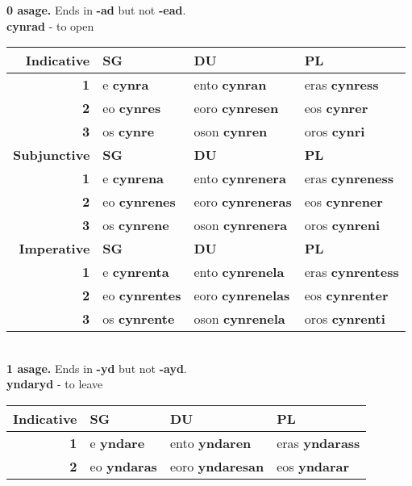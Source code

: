 \begin{center}
  \textbf{0 asage.} Ends in \textbf{-ad} but not \textbf{-ead}. \\
  \textbf{cynrad} - to open \\
  \begin{tabular}{|r|l|l|l|}
    \hline
    \textbf{Indicative} & \textbf{SG} & \textbf{DU} & \textbf{PL} \\ \hline
    \textbf{1} & e \textbf{cynra} & ento \textbf{cynran} & eras \textbf{cynress} \\ \hline
    \textbf{2} & eo \textbf{cynres} & eoro \textbf{cynresen} & eos \textbf{cynrer} \\ \hline
    \textbf{3} & os \textbf{cynre} & oson \textbf{cynren} & oros \textbf{cynri} \\ \hline
    \textbf{Subjunctive} & \textbf{SG} & \textbf{DU} & \textbf{PL} \\ \hline
    \textbf{1} & e \textbf{cynrena} & ento \textbf{cynrenera} & eras \textbf{cynreness} \\ \hline
    \textbf{2} & eo \textbf{cynrenes} & eoro \textbf{cynreneras} & eos \textbf{cynrener} \\ \hline
    \textbf{3} & os \textbf{cynrene} & oson \textbf{cynrenera} & oros \textbf{cynreni} \\ \hline
    \textbf{Imperative} & \textbf{SG} & \textbf{DU} & \textbf{PL} \\ \hline
    \textbf{1} & e \textbf{cynrenta} & ento \textbf{cynrenela} & eras \textbf{cynrentess} \\ \hline
    \textbf{2} & eo \textbf{cynrentes} & eoro \textbf{cynrenelas} & eos \textbf{cynrenter} \\ \hline
    \textbf{3} & os \textbf{cynrente} & oson \textbf{cynrenela} & oros \textbf{cynrenti} \\ \hline
  \end{tabular} \\
  \textbf{1 asage.} Ends in \textbf{-yd} but not \textbf{-ayd}. \\
  \textbf{yndaryd} - to leave \\
  \begin{tabular}{|r|l|l|l|}
    \hline
    \textbf{Indicative} & \textbf{SG} & \textbf{DU} & \textbf{PL} \\ \hline
    \textbf{1} & e \textbf{yndare} & ento \textbf{yndaren} & eras \textbf{yndarass} \\ \hline
    \textbf{2} & eo \textbf{yndaras} & eoro \textbf{yndaresan} & eos \textbf{yndarar} \\ \hline

\end{tabular}
\end{center}
